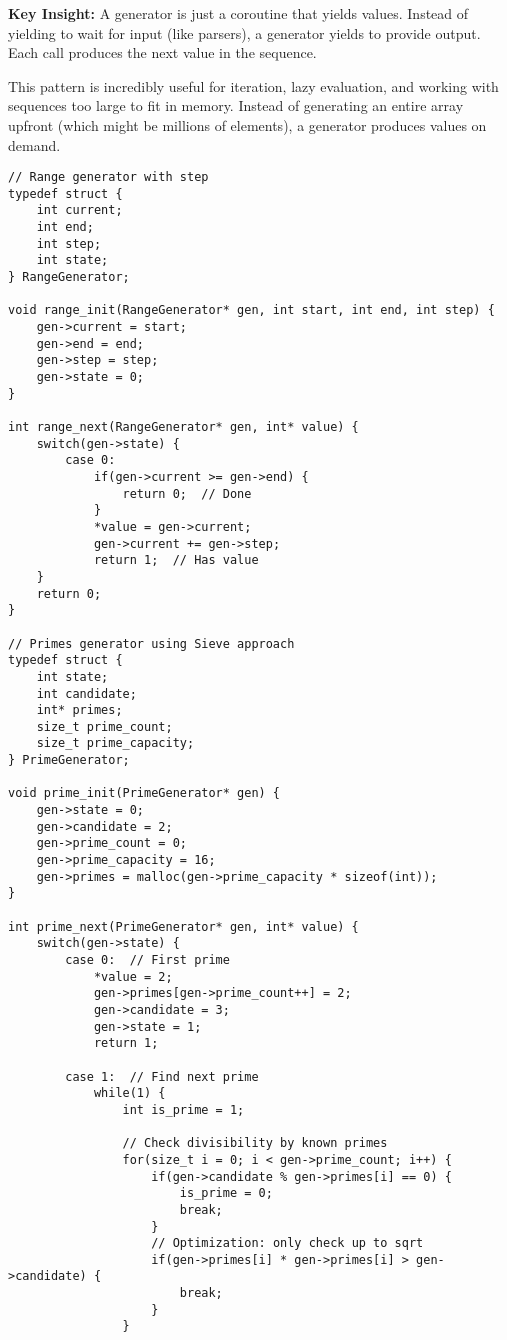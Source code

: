 \begin{notebox}
\textbf{Key Insight:} A generator is just a coroutine that yields values. Instead of yielding to wait for input (like parsers), a generator yields to provide output. Each call produces the next value in the sequence.
\end{notebox}

\vspace{0.2cm}
\noindent This pattern is incredibly useful for iteration, lazy evaluation, and working with sequences too large to fit in memory. Instead of generating an entire array upfront (which might be millions of elements), a generator produces values on demand.

\begin{lstlisting}
// Range generator with step
typedef struct {
    int current;
    int end;
    int step;
    int state;
} RangeGenerator;

void range_init(RangeGenerator* gen, int start, int end, int step) {
    gen->current = start;
    gen->end = end;
    gen->step = step;
    gen->state = 0;
}

int range_next(RangeGenerator* gen, int* value) {
    switch(gen->state) {
        case 0:
            if(gen->current >= gen->end) {
                return 0;  // Done
            }
            *value = gen->current;
            gen->current += gen->step;
            return 1;  // Has value
    }
    return 0;
}

// Primes generator using Sieve approach
typedef struct {
    int state;
    int candidate;
    int* primes;
    size_t prime_count;
    size_t prime_capacity;
} PrimeGenerator;

void prime_init(PrimeGenerator* gen) {
    gen->state = 0;
    gen->candidate = 2;
    gen->prime_count = 0;
    gen->prime_capacity = 16;
    gen->primes = malloc(gen->prime_capacity * sizeof(int));
}

int prime_next(PrimeGenerator* gen, int* value) {
    switch(gen->state) {
        case 0:  // First prime
            *value = 2;
            gen->primes[gen->prime_count++] = 2;
            gen->candidate = 3;
            gen->state = 1;
            return 1;

        case 1:  // Find next prime
            while(1) {
                int is_prime = 1;

                // Check divisibility by known primes
                for(size_t i = 0; i < gen->prime_count; i++) {
                    if(gen->candidate % gen->primes[i] == 0) {
                        is_prime = 0;
                        break;
                    }
                    // Optimization: only check up to sqrt
                    if(gen->primes[i] * gen->primes[i] > gen->candidate) {
                        break;
                    }
                }


\end{lstlisting}
